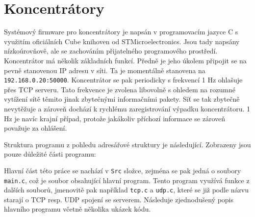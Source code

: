 \section{Koncentrátory}
Systémový firmware pro koncentrátory je napsán v programovacím jazyce C s využitím oficiálních Cube knihoven od STMicroelectronics. Jsou tady napsány nízkoúrovňově, ale se zachováním přijatelného programového pro\-stře\-dí. Koncentrátor má několik základních funkcí. Předně je jeho úkolem připojit se na pevně stanovenou IP adresu v síti. Ta je momentálně stanovena na \texttt{192.168.0.20:50000}. Koncentrátor se pak periodicky s frekvencí 1 Hz o\-hla\-šu\-je přes TCP serveru. Tato frekvence je zvolena libovolně s ohledem na rozumné vytížení sítě těmito jinak zbytečnými informačními pakety. Síť se tak zbytečně nevytěžuje a zároveň dochází k rychlému zaregistrování výpadku koncentrátoru. 1 Hz je navíc krajní případ, protože jakákoliv příchozí informace se zároveň považuje za ohlášení.

Struktura programu z pohledu adresářové struktury je následující. Zobrazeny jsou pouze důležité části programu:

\begin{figure}[H]
\end{figure}

Hlavní část této práce se nachází v \texttt{Src} složce, zejména se pak jedná o soubory \texttt{main.c}, což je soubor obsahující hlavní program. Tento program využívá funkce z dalších souborů, jmenovitě pak například \texttt{tcp.c} a \texttt{udp.c}, které se již podle názvu starají o TCP resp. UDP spojení se serverem. Následuje zjednodušený popis hlavního programu včetně několika ukázek kódu.

